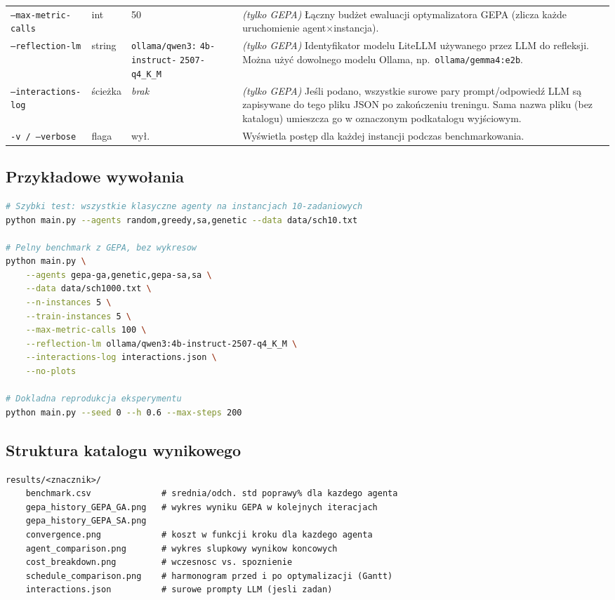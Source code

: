 \documentclass[11pt,a4paper]{article}
\begin{document}
\begin{longtable}{@{}p{4.5cm} p{2.2cm} p{2.2cm} p{6.3cm}@{}}
\texttt{--max-metric-calls} & int & 50 &
    \textit{(tylko GEPA)} Łączny budżet ewaluacji optymalizatora GEPA
    (zlicza każde uruchomienie agent$\times$instancja). \\[4pt]

\texttt{--reflection-lm} & string & \texttt{ollama/qwen3:} \texttt{4b-instruct-} \texttt{2507-q4\_K\_M} &
    \textit{(tylko GEPA)} Identyfikator modelu LiteLLM używanego przez LLM
    do refleksji. Można użyć dowolnego modelu Ollama,
    np.\ \texttt{ollama/gemma4:e2b}. \\[4pt]

\texttt{--interactions-log} & ścieżka & \textit{brak} &
    \textit{(tylko GEPA)} Jeśli podano, wszystkie surowe pary prompt/odpowiedź
    LLM są zapisywane do tego pliku JSON po zakończeniu treningu.
    Sama nazwa pliku (bez katalogu) umieszcza go w oznaczonym podkatalogu
    wyjściowym. \\[4pt]

\texttt{-v / --verbose} & flaga & wył. &
    Wyświetla postęp dla każdej instancji podczas benchmarkowania. \\

\bottomrule
\end{longtable}

\subsection{Przykładowe wywołania}

\begin{lstlisting}[language=bash]
# Szybki test: wszystkie klasyczne agenty na instancjach 10-zadaniowych
python main.py --agents random,greedy,sa,genetic --data data/sch10.txt

# Pelny benchmark z GEPA, bez wykresow
python main.py \
    --agents gepa-ga,genetic,gepa-sa,sa \
    --data data/sch1000.txt \
    --n-instances 5 \
    --train-instances 5 \
    --max-metric-calls 100 \
    --reflection-lm ollama/qwen3:4b-instruct-2507-q4_K_M \
    --interactions-log interactions.json \
    --no-plots

# Dokladna reprodukcja eksperymentu
python main.py --seed 0 --h 0.6 --max-steps 200
\end{lstlisting}

\subsection{Struktura katalogu wynikowego}

\begin{lstlisting}
results/<znacznik>/
    benchmark.csv              # srednia/odch. std poprawy% dla kazdego agenta
    gepa_history_GEPA_GA.png   # wykres wyniku GEPA w kolejnych iteracjach
    gepa_history_GEPA_SA.png
    convergence.png            # koszt w funkcji kroku dla kazdego agenta
    agent_comparison.png       # wykres slupkowy wynikow koncowych
    cost_breakdown.png         # wczesnosc vs. spoznienie
    schedule_comparison.png    # harmonogram przed i po optymalizacji (Gantt)
    interactions.json          # surowe prompty LLM (jesli zadan)
\end{lstlisting}
\end{document}
